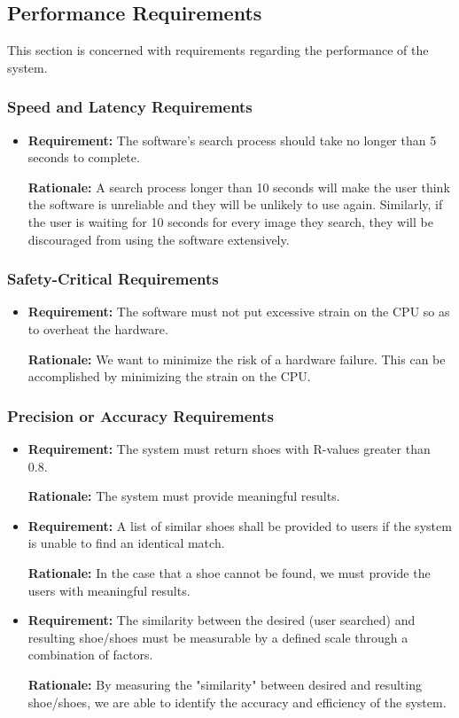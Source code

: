 \documentclass[12pt, titlepage]{article}
\begin{document}
\subsection{Performance Requirements}
This section is concerned with requirements regarding the performance of the system.
\subsubsection{Speed and Latency Requirements}
\begin{itemize}
    \item \textbf{Requirement:} The software's search process should take no longer than 5 seconds to complete.
    
    \textbf{Rationale:} A search process longer than 10 seconds will make the user think the software is unreliable and they will be unlikely to use again. Similarly, if the user is waiting for 10 seconds for every image they search, they will be discouraged from using the software extensively.
\end{itemize}

\subsubsection{Safety-Critical Requirements}
\begin{itemize}
    \item \textbf{Requirement:} The software must not put excessive strain on the CPU so as to overheat the hardware.
    
    \textbf{Rationale:} We want to minimize the risk of a hardware failure. This can be accomplished by minimizing the strain on the CPU.
\end{itemize}

\subsubsection{Precision or Accuracy Requirements}
\begin{itemize} 
    \item 
    \textbf{Requirement:} The system must return shoes with R-values greater than 0.8.
    
    \textbf{Rationale:} The system must provide meaningful results.
    
    \item 
    \textbf{Requirement:} A list of similar shoes shall be provided to users if the system is unable to find an identical match.
    
    \textbf{Rationale:} In the case that a shoe cannot be found, we must provide the users with meaningful results.
    
    
    \item 
    \textbf{Requirement:} The similarity between the desired (user searched) and resulting shoe/shoes must be measurable by a defined scale through a combination of factors.
    
    \textbf{Rationale:} By measuring the "similarity" between desired and resulting shoe/shoes, we are able to identify the accuracy and efficiency of the system.
    
    
\end{itemize}
\end{document}
